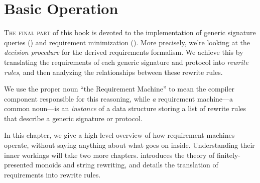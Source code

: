 \documentclass[../generics]{subfiles}
\begin{document}
\chapter{Basic Operation}\label{rqm basic operation}

\lettrine{T}{he final part} of this book is devoted to the implementation of generic signature queries () and requirement minimization (). More precisely, we're looking at the \emph{decision procedure} for the derived requirements formalism. We achieve this by translating the requirements of each generic signature and protocol into \emph{rewrite rules}, and then analyzing the relationships between these rewrite rules.

We use the proper noun ``the Requirement Machine'' to mean the compiler component responsible for this reasoning, while \emph{a} requirement machine---a common noun---is an \emph{instance} of a data structure storing a list of rewrite rules that describe a generic signature or protocol.

In this chapter, we give a high-level overview of how requirement machines operate, without saying anything about what goes on inside. Understanding their inner workings will take two more chapters.  introduces the theory of finitely-presented monoids and string rewriting, and  details the translation of requirements into rewrite rules.

\smallskip
\end{document}
